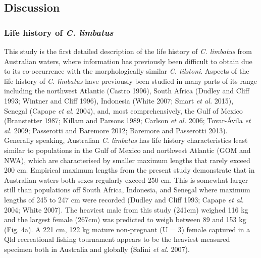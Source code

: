 \documentclass[]{article}
\begin{document}
\subsection{Discussion}\label{discussion}

\subsubsection{\texorpdfstring{Life history of \emph{C.
limbatus}}{Life history of C. limbatus}}\label{life-history-of-c.-limbatus}

This study is the first detailed description of the life history of
\emph{C. limbatus} from Australian waters, where information has
previously been difficult to obtain due to its co-occurrence with the
morphologically similar \emph{C. tilstoni}. Aspects of the life history
of \emph{C. limbatus} have previously been studied in many parts of its
range including the northwest Atlantic (Castro 1996), South Africa
(Dudley and Cliff 1993; Wintner and Cliff 1996), Indonesia (White 2007;
Smart \emph{et al.} 2015), Senegal (Capape \emph{et al.} 2004), and,
most comprehensively, the Gulf of Mexico (Branstetter 1987; Killam and
Parsons 1989; Carlson \emph{et al.} 2006; Tovar-Ávila \emph{et al.}
2009; Passerotti and Baremore 2012; Baremore and Passerotti 2013).
Generally speaking, Australian \emph{C. limbatus} has life history
characteristics least similar to populations in the Gulf of Mexico and
northwest Atlantic (GOM and NWA), which are characterised by smaller
maximum lengths that rarely exceed 200 cm. Empirical maximum lengths
from the present study demonstrate that in Australian waters both sexes
regularly exceed 250 cm. This is somewhat larger still than populations
off South Africa, Indonesia, and Senegal where maximum lengths of 245 to
247 cm were recorded (Dudley and Cliff 1993; Capape \emph{et al.} 2004;
White 2007). The heaviest male from this study (241cm) weighed 116 kg
and the largest female (267cm) was predicted to weigh between 89 and 153
kg (Fig. 4a). A 221 cm, 122 kg mature non-pregnant (U = 3) female
captured in a Qld recreational fishing tournament appears to be the
heaviest measured specimen both in Australia and globally (Salini
\emph{et al.} 2007).
\end{document}

